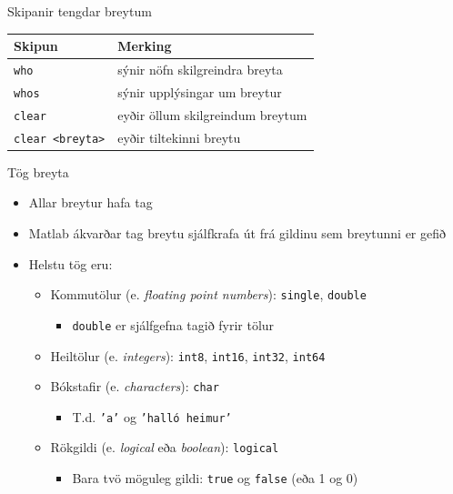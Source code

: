\documentclass[handout]{beamer}
\begin{document}
\begin{frame}{Skipanir tengdar breytum}
\begin{center}
\begin{tabular}{ll}
\toprule
Skipun&Merking\\
\midrule
\texttt{who}&sýnir nöfn skilgreindra breyta\\
\texttt{whos}&sýnir upplýsingar um breytur\\
\texttt{clear}&eyðir öllum skilgreindum breytum\\
\texttt{clear <breyta>}&eyðir tiltekinni breytu\\
\bottomrule
\end{tabular}
\end{center}
\end{frame}

\begin{frame}{Tög breyta}
\begin{itemize}
 \item Allar breytur hafa tag
 \item Matlab ákvarðar tag breytu sjálfkrafa út frá gildinu sem breytunni er gefið
 \item Helstu tög eru:
 \begin{itemize}
  \item Kommutölur (e. \emph{floating point numbers}):  \texttt{single}, \texttt{double}
  \begin{itemize}
   \item \texttt{double} er sjálfgefna tagið fyrir tölur
  \end{itemize}
  \item Heiltölur (e. \emph{integers}): \texttt{int8}, \texttt{int16}, \texttt{int32}, \texttt{int64}
  \item Bókstafir (e. \emph{characters}): \texttt{char}
  \begin{itemize}
   \item T.d. \texttt{'a'} og \texttt{'halló heimur'}
  \end{itemize}
  \item Rökgildi (e. \emph{logical} eða \emph{boolean}): \texttt{logical}
  \begin{itemize}
   \item Bara tvö möguleg gildi: \texttt{true} og \texttt{false} (eða 1 og 0)
  \end{itemize}
 \end{itemize}
\end{itemize}
\end{frame}
\end{document}
